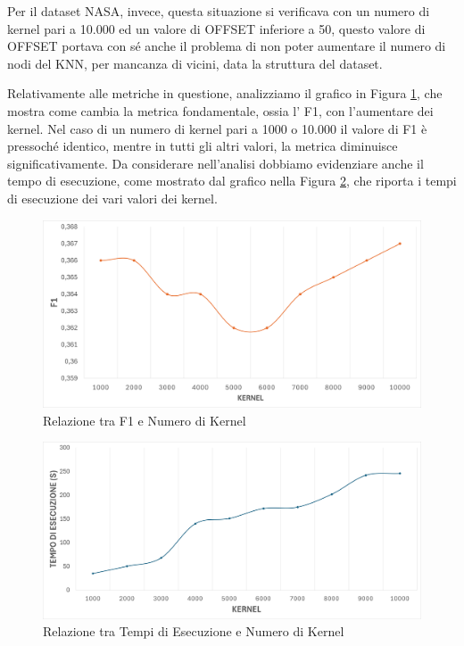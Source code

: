 Per il dataset NASA, invece, questa situazione si verificava con un numero di kernel pari a 10.000 ed un valore di OFFSET inferiore a 50, questo valore di OFFSET portava con sé anche il problema di non poter aumentare il numero di nodi del KNN, per mancanza di vicini, data la struttura del dataset.

Relativamente alle metriche in questione, analizziamo il grafico in Figura \ref{fig:grafico_f1}, che mostra come cambia la metrica fondamentale, ossia l' F1, con l'aumentare dei kernel.
Nel caso di un numero di kernel pari a 1000 o 10.000 il valore di F1 è pressoché identico, mentre in tutti gli altri valori, la metrica diminuisce significativamente.
Da considerare nell'analisi dobbiamo evidenziare anche il tempo di esecuzione, come mostrato dal grafico nella Figura \ref{fig:grafico_Tempo}, che riporta i tempi di esecuzione dei vari valori dei kernel.

\begin{figure}[!ht]
    \centering
    \includegraphics[width=0.9\linewidth]{images//Capitolo7/GraficoF1_ROCKET.png}
    \caption{Relazione tra F1 e Numero di Kernel}
    \label{fig:grafico_f1}
\end{figure}
\begin{figure}[!ht]
    \centering
    \includegraphics[width=0.9\linewidth]{images//Capitolo7/GraficoTempoEsecuzione_ROCKET.png}
    \caption{Relazione tra Tempi di Esecuzione e Numero di Kernel}
    \label{fig:grafico_Tempo}
\end{figure}
\pagebreak

